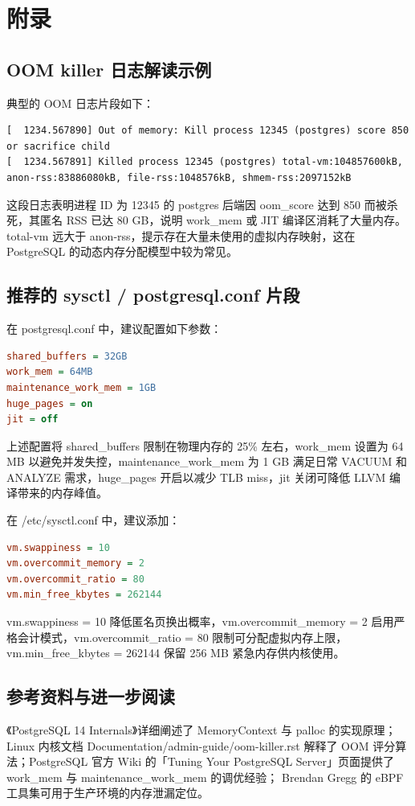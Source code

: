 \chapter{附录}
\section{OOM killer 日志解读示例}
典型的 OOM 日志片段如下：\par
\begin{lstlisting}[language=text]
[  1234.567890] Out of memory: Kill process 12345 (postgres) score 850 or sacrifice child
[  1234.567891] Killed process 12345 (postgres) total-vm:104857600kB, anon-rss:83886080kB, file-rss:1048576kB, shmem-rss:2097152kB
\end{lstlisting}
这段日志表明进程 ID 为 12345 的 postgres 后端因 oom\_{}score 达到 850 而被杀死，其匿名 RSS 已达 80 GB，说明 work\_{}mem 或 JIT 编译区消耗了大量内存。total-vm 远大于 anon-rss，提示存在大量未使用的虚拟内存映射，这在 PostgreSQL 的动态内存分配模型中较为常见。\par
\section{推荐的 sysctl / postgresql.conf 片段}
在 postgresql.conf 中，建议配置如下参数：\par
\begin{lstlisting}[language=ini]
shared_buffers = 32GB
work_mem = 64MB
maintenance_work_mem = 1GB
huge_pages = on
jit = off
\end{lstlisting}
上述配置将 shared\_{}buffers 限制在物理内存的 25\%{} 左右，work\_{}mem 设置为 64 MB 以避免并发失控，maintenance\_{}work\_{}mem 为 1 GB 满足日常 VACUUM 和 ANALYZE 需求，huge\_{}pages 开启以减少 TLB miss，jit 关闭可降低 LLVM 编译带来的内存峰值。\par
在 /etc/sysctl.conf 中，建议添加：\par
\begin{lstlisting}[language=ini]
vm.swappiness = 10
vm.overcommit_memory = 2
vm.overcommit_ratio = 80
vm.min_free_kbytes = 262144
\end{lstlisting}
vm.swappiness = 10 降低匿名页换出概率，vm.overcommit\_{}memory = 2 启用严格会计模式，vm.overcommit\_{}ratio = 80 限制可分配虚拟内存上限，vm.min\_{}free\_{}kbytes = 262144 保留 256 MB 紧急内存供内核使用。\par
\section{参考资料与进一步阅读}
《PostgreSQL 14 Internals》详细阐述了 MemoryContext 与 palloc 的实现原理；Linux 内核文档 Documentation/admin-guide/oom-killer.rst 解释了 OOM 评分算法；PostgreSQL 官方 Wiki 的「Tuning Your PostgreSQL Server」页面提供了 work\_{}mem 与 maintenance\_{}work\_{}mem 的调优经验； Brendan Gregg 的 eBPF 工具集可用于生产环境的内存泄漏定位。\par
